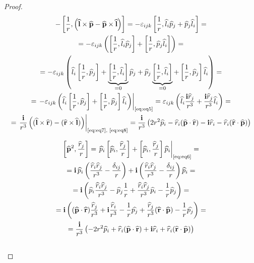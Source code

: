 \begin{proof}
\begin{equation}
\label{proof:4}
\begin{gathered}
-\left [ {\frac{1}{r}, \left ( {\widehat{\mathbf{l}} \times \widehat{\mathbf{p}} - \widehat{\mathbf{p}} \times \widehat{\mathbf{l}}} \right )} \right ] = 
-\varepsilon_{ijk} \left [ {\frac{1}{r}, \widehat{l}_i \widehat{p}_j + \widehat{p}_j \widehat{l}_i} \right ] = \\ =
-\varepsilon_{ijk} \left ( { \left [ {\frac{1}{r}, \widehat{l}_i \widehat{p}_j} \right ] + \left [ {\frac{1}{r}, \widehat{p}_j \widehat{l}_i} \right ] } \right ) = \\ = 
-\varepsilon_{ijk} \left ( { \widehat{l}_i \left [ {\frac{1}{r}, \widehat{p}_j} \right ] + \underbrace{ \left [ {\frac{1}{r}, \widehat{l}_i} \right ] }_{=0} \widehat{p}_j + \widehat{p}_j \underbrace{ \left [ {\frac{1}{r}, \widehat{l}_i} \right ] }_{=0} +  \left [ {\frac{1}{r}, \widehat{p}_j } \right ] \widehat{l}_i} \right ) = \\ =
\left. - \varepsilon_{ijk} \left ( { \widehat{l}_i \left [ {\frac{1}{r}, \widehat{p}_j} \right ] + \left [ {\frac{1}{r}, \widehat{p}_j } \right ] \widehat{l}_i} \right ) \right|_{\text{\eqref{eq:eq5}}} = 
\varepsilon_{ijk} \left ( {\widehat{l}_i \frac{\mathbf{i} \widehat{r}_j}{r^3} + \frac{\mathbf{i} \widehat{r}_j}{r^3} \widehat{l}_i } \right ) = \\ = 
\left. \frac{\mathbf{i}}{r^3} \left ( { (\widehat{\mathbf{l}} \times \widehat{\mathbf{r}}) -(\widehat{\mathbf{r}} \times \widehat{\mathbf{l}}) } \right ) \right|_{\text{\eqref{eq:eq7}, \eqref{eq:eq8}}} = 
\frac{\mathbf{i}}{r^3} \left ( { 2 r^2 \widehat{p}_i - \widehat{r}_i (\widehat{\mathbf{p}} \cdot \widehat{\mathbf{r}}) - \mathbf{i} \widehat{r}_i - \widehat{r}_i (\widehat{\mathbf{r}} \cdot \widehat{\mathbf{p}}) } \right )
\end{gathered}
\end{equation}

\begin{equation}
\label{proof:5}
\begin{gathered}
\left [ {\widehat{\mathbf{p}}^2, \frac{\widehat{r}_j}{r}} \right ] =\left. \widehat{p}_i \left [ {\widehat{p}_i, \frac{\widehat{r}_j}{r}} \right ] + \left [ {\widehat{p}_i, \frac{\widehat{r}_j}{r}} \right ] \widehat{p}_i \right|_{\text{\eqref{eq:eq6}}} = \\ =
\mathbf{i}\,\widehat{p}_i \left ( {\frac{\widehat{r}_i \widehat{r}_j}{r^3} - \frac{\delta_{ij}}{r}} \right ) + \mathbf{i}\left ( {\frac{\widehat{r}_i \widehat{r}_j}{r^3} - \frac{\delta_{ij}}{r}} \right ) \widehat{p}_i = \\ = 
\mathbf{i} \left ( { \widehat{p}_i \frac{\widehat{r}_i \widehat{r}_j}{r^3} - \widehat{p}_j \frac{1}{r} + \frac{\widehat{r}_i \widehat{r}_j}{r^3} \widehat{p}_i - \frac{1}{r} \widehat{p}_j } \right ) = \\ = 
\mathbf{i}\left ( { (\widehat{\mathbf{p}} \cdot \widehat{\mathbf{r}}) \frac{\widehat{r}_j}{r^3} + \mathbf{i} \frac{\widehat{r}_i}{r^3} - \frac{1}{r} \widehat{p_j} + \frac{\widehat{r}_j}{r^3} (\widehat{\mathbf{r}} \cdot \widehat{\mathbf{p}}) - \frac{1}{r} \widehat{p_j} } \right ) = \\ =
\frac{\mathbf{i}}{r^3} \left ( { - 2 r^2 \widehat{p}_i + \widehat{r}_i (\widehat{\mathbf{p}} \cdot \widehat{\mathbf{r}}) + \mathbf{i} \widehat{r}_i + \widehat{r}_i (\widehat{\mathbf{r}} \cdot \widehat{\mathbf{p}}) } \right )
\end{gathered}
\end{equation}\\


\end{proof}

